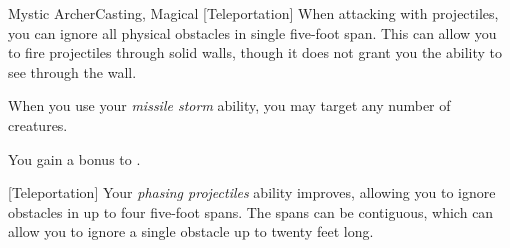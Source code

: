 \begin{feat}{Mystic Archer}{Casting, Magical}
        [Teleportation] When attacking with projectiles, you can ignore all physical obstacles in single five-foot span.
        This can allow you to fire projectiles through solid walls, though it does not grant you the ability to see through the wall.

         When you use your \textit{missile storm} ability, you may target any number of creatures.

         You gain a  bonus to .

        [Teleportation] Your \textit{phasing projectiles} ability improves, allowing you to ignore obstacles in up to four five-foot spans.
        The spans can be contiguous, which can allow you to ignore a single obstacle up to twenty feet long.
    \end{feat}

